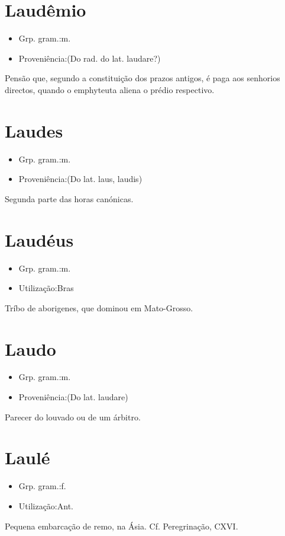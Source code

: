 \section{Laudêmio}
\begin{itemize}
\item {Grp. gram.:m.}
\end{itemize}
\begin{itemize}
\item {Proveniência:(Do rad. do lat. \textunderscore laudare\textunderscore ?)}
\end{itemize}
Pensão que, segundo a constituição dos prazos antigos, é paga aos senhorios directos, quando o emphyteuta aliena o prédio respectivo.
\section{Laudes}
\begin{itemize}
\item {Grp. gram.:m.}
\end{itemize}
\begin{itemize}
\item {Proveniência:(Do lat. \textunderscore laus\textunderscore , \textunderscore laudis\textunderscore )}
\end{itemize}
Segunda parte das horas canónicas.
\section{Laudéus}
\begin{itemize}
\item {Grp. gram.:m.}
\end{itemize}
\begin{itemize}
\item {Utilização:Bras}
\end{itemize}
Tríbo de aborigenes, que dominou em Mato-Grosso.
\section{Laudo}
\begin{itemize}
\item {Grp. gram.:m.}
\end{itemize}
\begin{itemize}
\item {Proveniência:(Do lat. \textunderscore laudare\textunderscore )}
\end{itemize}
Parecer do louvado ou de um árbitro.
\section{Laulé}
\begin{itemize}
\item {Grp. gram.:f.}
\end{itemize}
\begin{itemize}
\item {Utilização:Ant.}
\end{itemize}
Pequena embarcação de remo, na Ásia. Cf. \textunderscore Peregrinação\textunderscore , CXVI.
